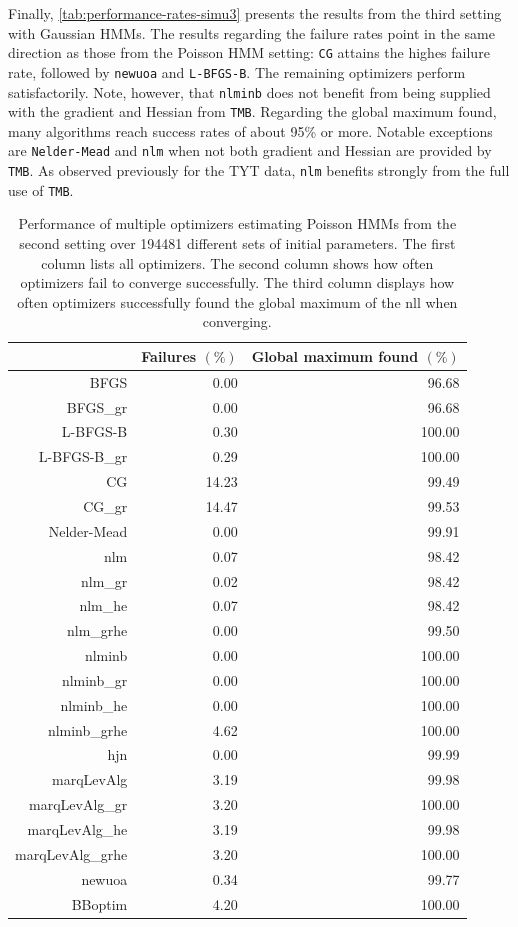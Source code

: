 \documentclass[]{interact}\usepackage[]{graphicx}\usepackage[dvipsnames]{xcolor}
\theoremstyle{plain}%
\theoremstyle{definition}
\theoremstyle{remark}
\begin{document}
Finally, \autoref{tab:performance-rates-simu3} presents the results from the third setting with Gaussian HMMs. The results regarding the failure rates point in the same direction as those from the Poisson HMM setting: \texttt{CG} attains the highes failure rate, followed by \texttt{newuoa} and \texttt{L-BFGS-B}. The remaining optimizers perform satisfactorily. Note, however, that \texttt{nlminb} does not benefit from being supplied with the gradient and Hessian from \texttt{TMB}. Regarding the global maximum found, many algorithms reach success rates of about 95\% or more. Notable exceptions are \texttt{Nelder-Mead} and \texttt{nlm} when not both gradient and Hessian are provided by \texttt{TMB}. As observed previously for the TYT data, \texttt{nlm} benefits strongly from the full use of \texttt{TMB}.

\begin{table}[ht]
\centering
\caption{Performance of multiple optimizers estimating Poisson HMMs from the second setting over 194481 different sets of initial parameters. The first column lists all optimizers. The second column shows how often optimizers fail to converge successfully. The third column displays how often optimizers successfully found the global maximum of the nll when converging.} 
\label{tab:performance-rates-simu1}
\begin{tabular}{rrr}
  \hline
 & Failures $(\%)$ & Global maximum found $(\%)$ \\ 
  \hline
BFGS & 0.00 & 96.68 \\ 
  BFGS\_gr & 0.00 & 96.68 \\ 
  L-BFGS-B & 0.30 & 100.00 \\ 
  L-BFGS-B\_gr & 0.29 & 100.00 \\ 
  CG & 14.23 & 99.49 \\ 
  CG\_gr & 14.47 & 99.53 \\ 
  Nelder-Mead & 0.00 & 99.91 \\ 
  nlm & 0.07 & 98.42 \\ 
  nlm\_gr & 0.02 & 98.42 \\ 
  nlm\_he & 0.07 & 98.42 \\ 
  nlm\_grhe & 0.00 & 99.50 \\ 
  nlminb & 0.00 & 100.00 \\ 
  nlminb\_gr & 0.00 & 100.00 \\ 
  nlminb\_he & 0.00 & 100.00 \\ 
  nlminb\_grhe & 4.62 & 100.00 \\ 
  hjn & 0.00 & 99.99 \\ 
  marqLevAlg & 3.19 & 99.98 \\ 
  marqLevAlg\_gr & 3.20 & 100.00 \\ 
  marqLevAlg\_he & 3.19 & 99.98 \\ 
  marqLevAlg\_grhe & 3.20 & 100.00 \\ 
  newuoa & 0.34 & 99.77 \\ 
  BBoptim & 4.20 & 100.00 \\ 
   \hline
\end{tabular}
\end{table}
\end{document}

